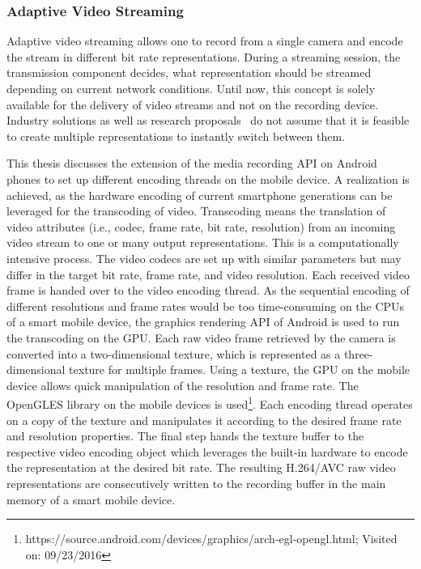 \subsubsection{Adaptive Video Streaming}
\label{sec:522_adaptiveStreaming_LiViU}
Adaptive video streaming allows one to record from a single camera and encode the stream in different bit rate representations.
During a streaming session, the transmission component decides, what representation should be streamed depending on current network conditions.
Until now, this concept is solely available for the delivery of video streams and not on the recording device.
Industry solutions as well as research proposals~\cite{Seo2012} do not assume that it is feasible to create multiple representations to instantly switch between them.

This thesis discusses the extension of the media recording \ac{API} on Android phones to set up different encoding threads on the mobile device.
A realization is achieved, as the hardware encoding of current smartphone generations can be leveraged for the transcoding of video. 
Transcoding means the translation of video attributes (i.e., codec, frame rate, bit rate, resolution) from an incoming video stream to one or many output representations.
This is a computationally intensive process. 
The video codecs are set up with similar parameters but may differ in the target bit rate, frame rate, and video resolution.
Each received video frame is handed over to the video encoding thread.
As the sequential encoding of different resolutions and frame rates would be too time-consuming on the \ac{CPU}s of a smart mobile device, the graphics rendering \ac{API} of Android is used to run the transcoding on the \ac{GPU}.
Each raw video frame retrieved by the camera is converted into a two-dimensional texture, which is represented as a three-dimensional texture for multiple frames.
Using a texture, the \ac{GPU} on the mobile device allows quick manipulation of the resolution and frame rate.
The \ac{OpenGLES} library on the mobile devices is used\footnote{https://source.android.com/devices/graphics/arch-egl-opengl.html; Visited on: 09/23/2016}.
Each encoding thread operates on a copy of the texture and manipulates it according to the desired frame rate and resolution properties.
The final step hands the texture buffer to the respective video encoding object which leverages the built-in hardware to encode the representation at the desired bit rate.
The resulting H.264/\ac{AVC} raw video representations are consecutively written to the recording buffer in the main memory of a smart mobile device.

